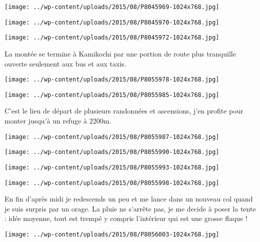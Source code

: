  \newline
\centerline{\texttt{[image: ../wp-content/uploads/2015/08/P8045969-1024x768.jpg]} } 
 \newline
 \newline
\centerline{\texttt{[image: ../wp-content/uploads/2015/08/P8045970-1024x768.jpg]} } 
 \newline
 \newline
\centerline{\texttt{[image: ../wp-content/uploads/2015/08/P8045972-1024x768.jpg]} } 
 \newline
 La montée se termine à Kamikochi par une portion de route plus tranquille ouverte seulement aux bus et aux taxis. \newline
 \newline
\centerline{\texttt{[image: ../wp-content/uploads/2015/08/P8055978-1024x768.jpg]} } 
 \newline
 \newline
\centerline{\texttt{[image: ../wp-content/uploads/2015/08/P8055985-1024x768.jpg]} } 
 \newline
 C'est le lieu de départ de plusieurs randonnées et ascensions, j'en profite pour monter jusqu'à un refuge à 2200m. \newline
 \newline
\centerline{\texttt{[image: ../wp-content/uploads/2015/08/P8055987-1024x768.jpg]} } 
 \newline
 \newline
\centerline{\texttt{[image: ../wp-content/uploads/2015/08/P8055990-1024x768.jpg]} } 
 \newline
 \newline
\centerline{\texttt{[image: ../wp-content/uploads/2015/08/P8055993-1024x768.jpg]} } 
 \newline
 \newline
\centerline{\texttt{[image: ../wp-content/uploads/2015/08/P8055998-1024x768.jpg]} } 
 \newline
 En fin d'après midi je redescends un peu et me lance dans un nouveau col quand je suis surpris par un orage. La pluie ne s'arrête pas, je me decide à poser la tente : idée moyenne, tout est trempé y compris l'intérieur qui est une grosse flaque ! \newline
 \newline
\centerline{\texttt{[image: ../wp-content/uploads/2015/08/P8056003-1024x768.jpg]} } 
 \newline
